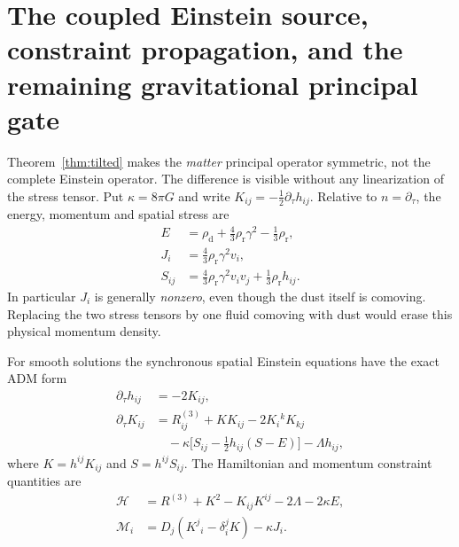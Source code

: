 \documentclass[11pt,a4paper]{article}
\begin{document}
\section{The coupled Einstein source, constraint propagation,
and the remaining gravitational principal gate}
\label{sec:closure}
Theorem~\ref{thm:tilted} makes the
\emph{matter} principal operator symmetric,
not the complete Einstein operator.
The difference is visible without any
linearization of the stress tensor.
Put $\kappa=8\pi G$ and
write $K_{ij}=-\tfrac12\partial_\tau h_{ij}$.
Relative to $n=\partial_\tau$, the
energy, momentum and spatial stress are
\begin{equation}\label{eq:tiltstress}
\begin{aligned}
E&=\rho_{\mathrm d}
+\frac43\rho_{\mathrm r}\gamma^2
-\frac13\rho_{\mathrm r},\\
J_i&=\frac43\rho_{\mathrm r}\gamma^2v_i,\\
S_{ij}&=\frac43\rho_{\mathrm r}\gamma^2v_i v_j
+\frac13\rho_{\mathrm r}h_{ij}.
\end{aligned}
\end{equation}
In particular $J_i$ is generally
\emph{nonzero}, even though the dust
itself is comoving. Replacing the two
stress tensors by one fluid comoving
with dust would erase this physical
momentum density.

For smooth solutions the synchronous
spatial Einstein equations have the
exact ADM form
\begin{equation}\label{eq:material-ADM}
\begin{aligned}
\partial_\tau h_{ij}&=-2K_{ij},\\
\partial_\tau K_{ij}
&=R^{(3)}_{ij}+K K_{ij}
-2K_i{}^kK_{kj}\\
&\quad-\kappa\bigl[S_{ij}
-\tfrac12 h_{ij}(S-E)\bigr]
-\Lambda h_{ij},
\end{aligned}
\end{equation}
where $K=h^{ij}K_{ij}$ and
$S=h^{ij}S_{ij}$. The Hamiltonian
and momentum constraint quantities are
\begin{equation}\label{eq:material-constraints}
\begin{aligned}
\mathcal H&=R^{(3)}+K^2-K_{ij}K^{ij}
-2\Lambda-2\kappa E,\\
\mathcal M_i&=D_j(K^j{}_i-\delta^j_iK)
-\kappa J_i .
\end{aligned}
\end{equation}
\end{document}
